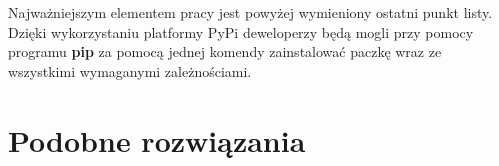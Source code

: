 \quad Najważniejszym elementem pracy jest powyżej wymieniony ostatni punkt listy. Dzięki wykorzystaniu platformy PyPi deweloperzy będą mogli przy pomocy programu \textbf{pip} za pomocą jednej komendy zainstalować paczkę wraz ze wszystkimi wymaganymi zależnościami. 

\section{Podobne rozwiązania}



